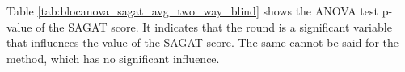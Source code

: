 Table \ref{tab:blocanova_sagat_avg_two_way_blind} shows the ANOVA test p-value of the SAGAT score. It indicates that the round is a significant variable that influences the value of the SAGAT score. The same cannot be said for the method, which has no significant influence.




%

